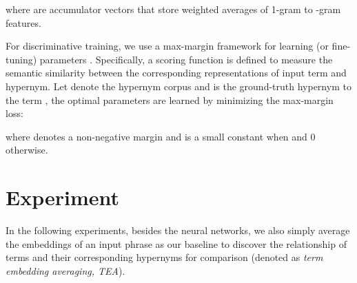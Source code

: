 \documentclass[11pt,a4paper]{article}
\begin{document}
where  are accumulator vectors that store weighted averages of 1-gram to -gram features.

For discriminative training, we use a max-margin framework for learning (or fine-tuning) parameters . Specifically, a scoring function  is defined to measure the semantic similarity between the corresponding representations of input term and hypernym. Let  denote the hypernym corpus and  is the ground-truth hypernym to the term , the optimal parameters  are learned by minimizing the max-margin loss:  

where  denotes a non-negative margin and  is a small constant when  and 0 otherwise. 

\section{Experiment}
In the following experiments, besides the neural networks, we also simply average the embeddings of an input phrase as our baseline to discover the relationship of terms and their corresponding hypernyms for comparison (denoted as \emph{term embedding averaging, TEA}).
\end{document}
